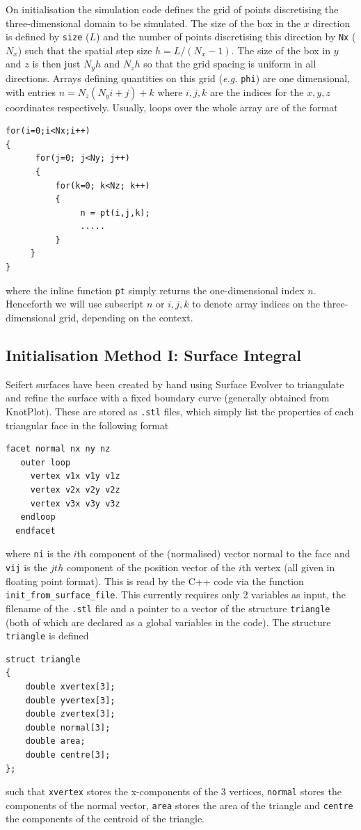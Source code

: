 \documentclass[notitlepage,aps,amsmath,amssymb,11pt]{revtex4-1}
\begin{document}
On initialisation the simulation code defines the grid of points discretising the three-dimensional domain to be simulated. The size of the box in the $x$ direction is defined by \verb'size' ($L$) and the number of points discretising this direction by \verb'Nx' ($N_x$) such that the spatial step size $h = L/(N_x-1)$. The size of the box in $y$ and $z$ is then just $N_y h$ and $N_z h$ so that the grid spacing is uniform in all directions. Arrays defining quantities on this grid (\emph{e.g.} \verb'phi') are one dimensional, with entries $n = N_z ( N_y i + j) + k$ where $i,j,k$ are the indices for the $x,y,z$ coordinates respectively. Usually, loops over the whole array are of the format
\begin{verbatim}
for(i=0;i<Nx;i++)
{
      for(j=0; j<Ny; j++)
      {
          for(k=0; k<Nz; k++)
          {
               n = pt(i,j,k);
               .....
          }
     }
}
\end{verbatim} 
where the inline function \verb'pt' simply returns the one-dimensional index $n$. Henceforth we will use subscript $n$ or $i,j,k$ to denote array indices on the three-dimensional grid, depending on the context.

\subsection{Initialisation Method I: Surface Integral}

Seifert surfaces have been created by hand using Surface Evolver to triangulate and refine the surface with a fixed boundary curve (generally obtained from KnotPlot). These are stored as \verb'.stl' files, which simply list the properties of each triangular face in the following format
\begin{verbatim}
facet normal nx ny nz
   outer loop
     vertex v1x v1y v1z
     vertex v2x v2y v2z
     vertex v3x v3y v3z
   endloop
  endfacet
\end{verbatim}
where \verb'ni' is the $i$th component of the (normalised) vector normal to the face and \verb'vij' is the $jth$ component of the position vector of the $i$th vertex (all given in floating point format). This is read by the C++ code via the function \verb'init_from_surface_file'. This currently requires only 2 variables as input, the filename of the \verb'.stl' file and a pointer to a vector of the structure \verb'triangle' (both of which are declared as a global variables in the code). The structure \verb'triangle' is defined
\begin{verbatim}
struct triangle
{
    double xvertex[3];  
    double yvertex[3];   
    double zvertex[3];   
    double normal[3];   
    double area;      
    double centre[3];  
};
\end{verbatim}
such that \verb'xvertex' stores the x-components of the 3 vertices, \verb'normal' stores the components of the normal vector, \verb'area' stores the area of the triangle and \verb'centre' the components of the centroid of the triangle. 
\end{document}
